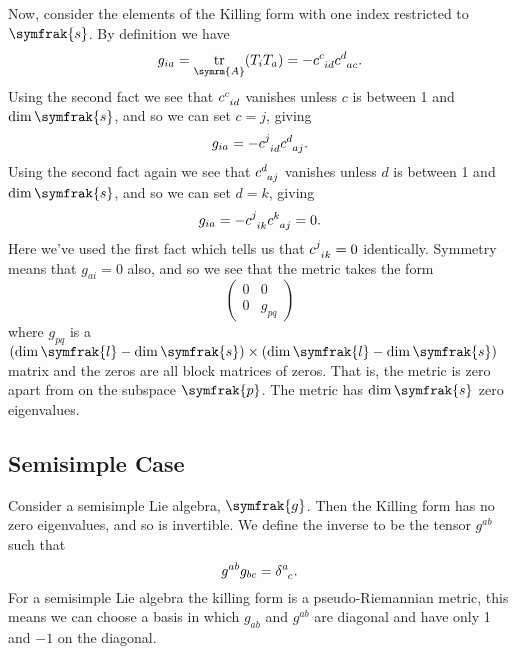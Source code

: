 \documentclass[fleqn]{NotesClass}
\renewcommand{\lie}[1]{\symfrak{#1}}
\DeclareMathOperator{\tr}{tr}
\begin{document}
    Now, consider the elements of the Killing form with one index restricted to \(\lie{s}\).
    By definition we have
    \begin{equation}
        g_{ia} = \tr_{\symrm{A}}(T_iT_a) = -\tensor{c}{^c_{id}} \tensor{c}{^d_{ac}}.
    \end{equation}
    Using the second fact we see that \(\tensor{c}{^c_{id}}\) vanishes unless \(c\) is between 1 and \(\dim\lie{s}\), and so we can set \(c = j\), giving
    \begin{equation}
        g_{ia} = -\tensor{c}{^j_{id}}\tensor{c}{^d_{aj}}.
    \end{equation}
    Using the second fact again we see that \(\tensor{c}{^d_{aj}}\) vanishes unless \(d\) is between 1 and \(\dim\lie{s}\), and so we can set \(d = k\), giving
    \begin{equation}
        g_{ia} = -\tensor{c}{^j_{ik}}\tensor{c}{^k_{aj}} = 0.
    \end{equation}
    Here we've used the first fact which tells us that \(\tensor{c}{^j_{ik}} = 0\) identically.
    Symmetry means that \(g_{ai} = 0\) also, and so we see that the metric takes the form
    \begin{equation}
        \begin{pmatrix}
            0 & 0\\
            0 & g_{pq}
        \end{pmatrix}
    \end{equation}
    where \(g_{pq}\) is a \((\dim\lie{l} - \dim\lie{s}) \times (\dim\lie{l} - \dim\lie{s})\) matrix and the zeros are all block matrices of zeros.
    That is, the metric is zero apart from on the subspace \(\lie{p}\).
    The metric has \(\dim\lie{s}\) zero eigenvalues.
    
    \subsection{Semisimple Case}
    Consider a semisimple Lie algebra, \(\lie{g}\).
    Then the Killing form has no zero eigenvalues, and so is invertible.
    We define the inverse to be the tensor \(g^{ab}\) such that
    \begin{equation}
        g^{ab}g_{bc} = \tensor{\delta}{^a_c}.
    \end{equation}
    For a semisimple Lie algebra the killing form is a pseudo-Riemannian metric, this means we can choose a basis in which \(g_{ab}\) and \(g^{ab}\) are diagonal and have only 1 and \(-1\) on the diagonal.
    
\end{document}
